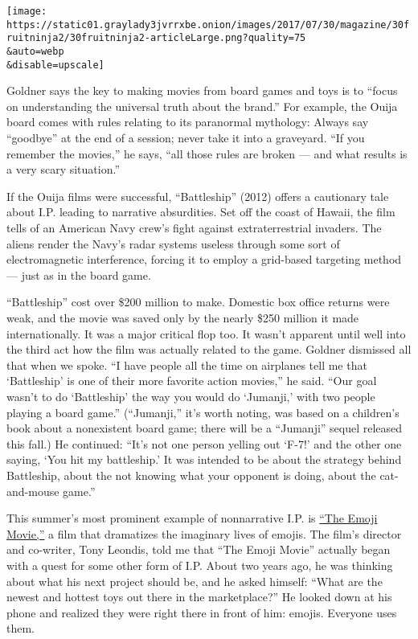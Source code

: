 \texttt{[image: https://static01.graylady3jvrrxbe.onion/images/2017/07/30/magazine/30fruitninja2/30fruitninja2-articleLarge.png?quality=75\\\&auto=webp\\\&disable=upscale]}

Goldner says the key to making movies from board games and toys is to
``focus on understanding the universal truth about the brand.'' For
example, the Ouija board comes with rules relating to its paranormal
mythology: Always say ``goodbye'' at the end of a session; never take it
into a graveyard. ``If you remember the movies,'' he says, ``all those
rules are broken --- and what results is a very scary situation.''

If the Ouija films were successful, ``Battleship'' (2012) offers a
cautionary tale about I.P. leading to narrative absurdities. Set off the
coast of Hawaii, the film tells of an American Navy crew's fight against
extraterrestrial invaders. The aliens render the Navy's radar systems
useless through some sort of electromagnetic interference, forcing it to
employ a grid-­based targeting method --- just as in the board game.

``Battleship'' cost over \$200 million to make. Domestic box office
returns were weak, and the movie was saved only by the nearly \$250
million it made internationally. It was a major critical flop too. It
wasn't apparent until well into the third act how the film was actually
related to the game. Goldner dismissed all that when we spoke. ``I have
people all the time on airplanes tell me that `Battleship' is one of
their more favorite action movies,'' he said. ``Our goal wasn't to do
`Battleship' the way you would do `Jumanji,' with two people playing a
board game.'' (``Jumanji,'' it's worth noting, was based on a children's
book about a nonexistent board game; there will be a ``Jumanji'' sequel
released this fall.) He continued: ``It's not one person yelling out
`F-7!' and the other one saying, `You hit my battleship.' It was
intended to be about the strategy behind Battleship, about the not
knowing what your opponent is doing, about the cat-and-mouse game.''

This summer's most prominent example of non­narrative I.P. is
\href{https://www.nytimes3xbfgragh.onion/2017/07/27/movies/the-emoji-movie-review.html}{``The
Emoji Movie,''} a film that dramatizes the imaginary lives of emojis.
The film's director and co-­writer, Tony Leondis, told me that ``The
Emoji Movie'' actually began with a quest for some other form of I.P.
About two years ago, he was thinking about what his next project should
be, and he asked himself: ``What are the newest and hottest toys out
there in the marketplace?'' He looked down at his phone and realized
they were right there in front of him: emojis. Everyone uses them.

